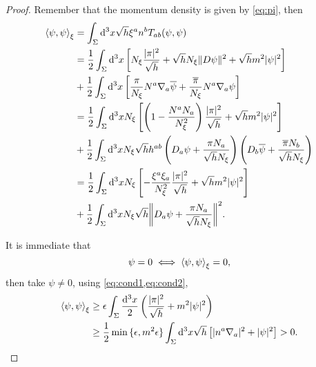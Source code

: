 \begin{proof}
    Remember that the momentum density is given by \cref{eq:pi}, then
    \begin{subequations}
        \begin{align}
            \left\langle \psi,\psi\right\rangle_{\xi}&=\int_{\Sigma}\mathrm{d}^3x\sqrt{h}\xi^an^bT_{ab}(\psi,\psi)\\
            &=\frac{1}{2}\int_{\Sigma}\mathrm{d}^3x \left[N_{\xi}\frac{\lvert\pi\rvert^2}{\sqrt{h}}+\sqrt{h}N_\xi\lVert D\psi\rVert^2+\sqrt{h}m^2\lvert\psi\rvert^2\right]\\
            &+\frac{1}{2}\int_{\Sigma}\mathrm{d}^3x\left[\frac{\pi}{N_\xi}N^a\nabla_a\overline{\psi}+\frac{\overline{\pi}}{N_\xi}N^a\nabla_a\psi\right]\\
            &=\frac{1}{2}\int_{\Sigma}\mathrm{d}^3xN_\xi\left[\left(1-\frac{N^aN_a}{N^2_\xi}\right)\frac{\lvert\pi\rvert^2}{\sqrt{h}}+\sqrt{h}m^2\lvert\psi\rvert^2\right]\\
            &+\frac{1}{2}\int_{\Sigma}\mathrm{d}^3xN_\xi\sqrt{h}h^{ab}\left(D_a\psi+\frac{\pi N_a}{\sqrt{h}N_\xi}\right)\left(D_b\overline{\psi}+\frac{\overline{\pi}N_b}{\sqrt{h}N_\xi}\right)\\
            &=\frac{1}{2}\int_{\Sigma}\mathrm{d}^3xN_\xi\left[-\frac{\xi^a\xi_a}{N_\xi^2}\frac{\lvert\pi\rvert^2}{\sqrt{h}}+\sqrt{h}m^2\lvert\psi\rvert^2\right]\\
            &+\frac{1}{2}\int_{\Sigma}\mathrm{d}^3xN_\xi\sqrt{h}\bigg\Vert D_a\psi+\frac{\pi N_a}{\sqrt{h}N_\xi}\bigg\Vert^2.
        \end{align}
    \end{subequations}

    It is immediate that
    \begin{equation}
        \psi=0\iff\left\langle \psi,\psi\right\rangle_{\xi}=0,
    \end{equation}
    then take \(\psi\neq 0\), using \cref{eq:cond1,eq:cond2},
    \begin{subequations}
        \begin{align}
            \left\langle \psi,\psi\right\rangle_{\xi}&\geq\epsilon\int_{\Sigma}\frac{\mathrm{d}^3x}{2}\left(\frac{\lvert\pi\rvert^2}{\sqrt{h}}+m^2\lvert\psi\rvert^2\right)\\
            &\geq\frac{1}{2}\min{\{\epsilon,m^2\epsilon\}}\int_{\Sigma}\mathrm{d}^3x\sqrt{h}\left[\lvert n^a\nabla_a\rvert^2+\lvert\psi\rvert^2\right]>0.
        \end{align}
    \end{subequations}
\end{proof}

